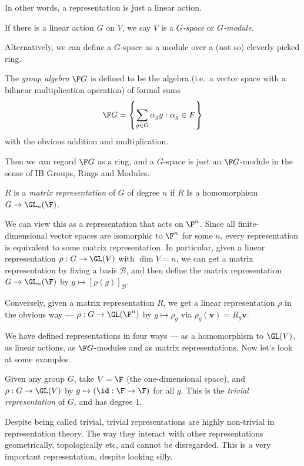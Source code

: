 \documentclass[a4paper]{article}
\begin{document}
In other words, a representation is just a linear action.

\begin{defi}
  If there is a linear action $G$ on $V$, we say $V$ is a \emph{$G$-space} or \emph{$G$-module}.
\end{defi}

Alternatively, we can define a $G$-space as a module over a (not so) cleverly picked ring.
\begin{defi}
  The \emph{group algebra} $\F G$ is defined to be the algebra (i.e.\ a vector space with a bilinear multiplication operation) of formal sums
  \[
    \F G = \left\{ \sum_{g \in G} \alpha_g g: \alpha_g \in F\right\}
  \]
  with the obvious addition and multiplication.
\end{defi}
Then we can regard $\F G$ as a ring, and a $G$-space is just an $\F G$-module in the sense of IB Groups, Rings and Modules.

\begin{defi}
  $R$ is a \emph{matrix representation} of $G$ of degree $n$ if $R$ Is a homomorphism $G \to \GL_n(\F)$.
\end{defi}
We can view this as a representation that acts on $\F^n$. Since all finite-dimensional vector spaces are isomorphic to $\F^n$ for some $n$, every representation is equivalent to some matrix representation. In particular, given a linear representation $\rho: G \to \GL(V)$ with $\dim V = n$, we can get a matrix representation by fixing a basis $\mathcal{B}$, and then define the matrix representation $G \to \GL_n(\F)$ by $g \mapsto [\rho(g)]_{\mathcal{B}}$.

Conversely, given a matrix representation $R$, we get a linear representation $\rho$ in the obvious way --- $\rho: G \to \GL(\F^n)$ by $g \mapsto \rho_g$ via $\rho_g(\mathbf{v}) = R_g \mathbf{v}$.

We have defined representations in four ways --- as a homomorphism to $\GL(V)$, as linear actions, as $\F G$-modules and as matrix representations. Now let's look at some examples.

\begin{eg}
  Given any group $G$, take $V = \F$ (the one-dimensional space), and $\rho: G \to \GL(V)$ by $g \mapsto (\id: \F \to \F)$ for all $g$. This is the \emph{trivial representation} of $G$, and has degree $1$.
\end{eg}
Despite being called trivial, trivial representations are highly non-trivial in representation theory. The way they interact with other representations geometrically, topologically etc, and cannot be disregarded. This is a very important representation, despite looking silly.
\end{document}
